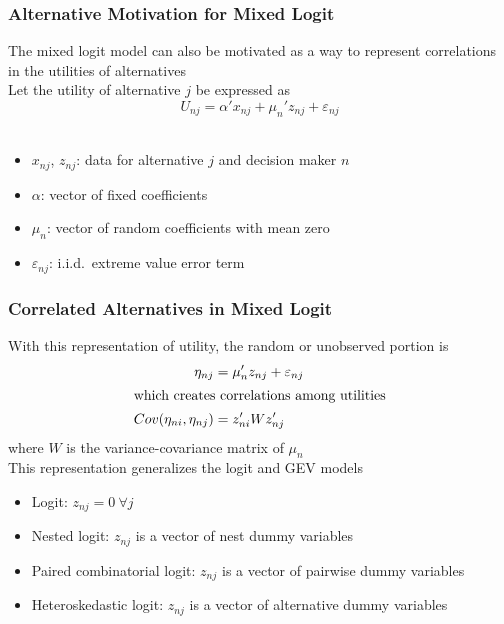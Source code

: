 \documentclass{beamer}
\begin{document}
\begin{frame}\frametitle{Alternative Motivation for Mixed Logit}
    The mixed logit model can also be motivated as a way to represent correlations in the utilities of alternatives \\
    \vspace{3ex}
    Let the utility of alternative $j$ be expressed as
    $$U_{nj} = \alpha' x_{nj} + \mu_n' z_{nj} + \varepsilon_{nj}$$ \\
    \begin{itemize}
        \item $x_{nj}$, $z_{nj}$: data for alternative $j$ and decision maker $n$
        \item $\alpha$: vector of fixed coefficients
        \item $\mu_n$: vector of random coefficients with mean zero
        \item $\varepsilon_{nj}$: i.i.d.\ extreme value error term
    \end{itemize}
\end{frame}

\begin{frame}\frametitle{Correlated Alternatives in Mixed Logit}
    With this representation of utility, the random or unobserved portion is
    \begin{align*}
        \eta_{nj} &= \mu_n' z_{nj} + \varepsilon_{nj} \\
        \intertext{which creates correlations among utilities}
        Cov(\eta_{ni}, \eta_{nj}) &= z_{ni}' W z_{nj}'
    \end{align*}
    where $W$ is the variance-covariance matrix of $\mu_n$ \\
    \vspace{2ex}
    This representation generalizes the logit and GEV models
    \begin{itemize}
        \item Logit: $z_{nj} = 0 ~\forall j$
        \item Nested logit: $z_{nj}$ is a vector of nest dummy variables
        \item Paired combinatorial logit: $z_{nj}$ is a vector of pairwise dummy variables
        \item Heteroskedastic logit: $z_{nj}$ is a vector of alternative dummy variables
    \end{itemize}
\end{frame}
\end{document}

